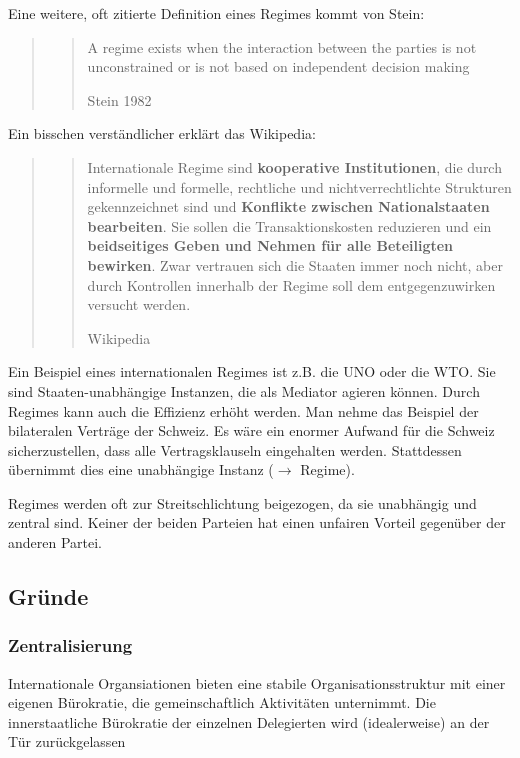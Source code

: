 \documentclass[a4paper, 11pt]{article}
\begin{document}
\noindent Eine weitere, oft zitierte Definition eines Regimes kommt von Stein:
\begin{quote}
	\centering
	\blockquote[Stein 1982]{A regime exists when the interaction between the parties is not unconstrained or is not based on independent decision making}
\end{quote}

\noindent Ein bisschen verständlicher erklärt das Wikipedia: 
\begin{quote}
	\centering
	\blockquote[Wikipedia]{Internationale Regime sind \textbf{kooperative Institutionen}, die durch informelle und formelle, rechtliche und nichtverrechtlichte Strukturen gekennzeichnet sind und \textbf{Konflikte zwischen Nationalstaaten bearbeiten}. Sie sollen die Transaktionskosten reduzieren und ein \textbf{beidseitiges Geben und Nehmen für alle Beteiligten bewirken}. Zwar vertrauen sich die Staaten immer noch nicht, aber durch Kontrollen innerhalb der Regime soll dem entgegenzuwirken versucht werden.}
\end{quote}
Ein Beispiel eines internationalen Regimes ist z.B. die UNO oder die WTO. Sie sind Staaten-unabhängige Instanzen, die als Mediator agieren können. Durch Regimes kann auch die Effizienz erhöht werden. Man nehme das Beispiel der bilateralen Verträge der Schweiz. Es wäre ein enormer Aufwand für die Schweiz sicherzustellen, dass alle Vertragsklauseln eingehalten werden. Stattdessen übernimmt dies eine unabhängige Instanz ($\rightarrow$ Regime).  


\vspace{10px}

Regimes werden oft zur Streitschlichtung beigezogen, da sie unabhängig und zentral sind. Keiner der beiden Parteien hat einen unfairen Vorteil gegenüber der anderen Partei.

\subsection{Gründe}

\subsubsection*{Zentralisierung}

Internationale Organsiationen bieten eine stabile Organisationsstruktur mit einer eigenen Bürokratie, die gemeinschaftlich Aktivitäten unternimmt. Die innerstaatliche Bürokratie der einzelnen Delegierten wird (idealerweise) an der Tür zurückgelassen
\end{document}
